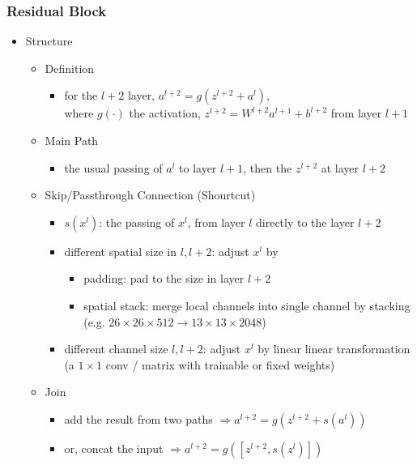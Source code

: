 \subsubsection{Residual Block} \label{DL_Block_Res}
\begin{itemize}
\item Structure
	\begin{itemize}
	\item Definition
		\begin{itemize}
		\item for the $l+2$ layer, $a^{l+2} = g(z^{l+2} + a^l)$, \\
		where $g(\cdot)$ the activation, $z^{l+2} = W^{l+2}a^{l+1}+b^{l+2}$ from layer $l+1$ 
		\end{itemize}
	\item Main Path
		\begin{itemize}
		\item the usual passing of $a^l$ to layer $l+1$, then the $z^{l+2}$ at layer $l+2$
		\end{itemize}
	\item Skip/Passthrough Connection (Shourtcut) \label{DL_Block_Res_Passthrough}
		\begin{itemize}
		\item $s(x^l)$: the passing of $x^{l}$, from layer $l$ directly to the layer $l+2$
		\item different spatial size in $l, {l+2}$: adjust $x^l$ by
			\begin{itemize}
			\item padding: pad to the size in layer ${l+2}$
			\item spatial stack: merge local channels into single channel by stacking \\
			(e.g. $26\times26\times512\rightarrow13\times13\times2048$)
			\end{itemize}
		\item different channel size $l, {l+2}$: adjust $x^l$ by linear linear transformation \\ 
		(a $1\times1$ conv / matrix with trainable or fixed weights)
		\end{itemize}
	\item Join
		\begin{itemize}
		\item add the result from two paths $\Rightarrow a^{l+2}=g(z^{l+2}+s(a^l))$
		\item or, concat the input $\Rightarrow a^{l+2}=g([z^{l+2}, s(z^{l})])$
		\end{itemize}
	\end{itemize}


\end{itemize}
